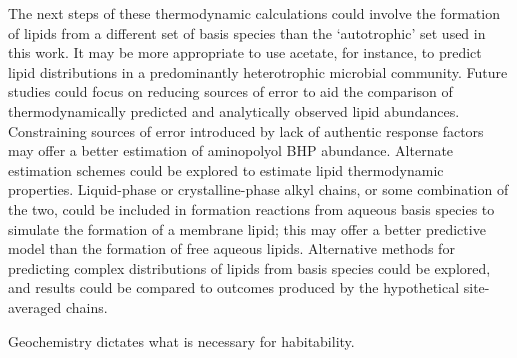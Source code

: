 The next steps of these thermodynamic calculations could involve the formation of lipids from a different set of basis species than the `autotrophic' set used in this work. It may be more appropriate to use acetate, for instance, to predict lipid distributions in a predominantly heterotrophic microbial community. Future studies could focus on reducing sources of error to aid the comparison of thermodynamically predicted and analytically observed lipid abundances. Constraining sources of error introduced by lack of authentic response factors may offer a better estimation of aminopolyol BHP abundance. Alternate estimation schemes could be explored to estimate lipid thermodynamic properties. Liquid-phase or crystalline-phase alkyl chains, or some combination of the two, could be included in formation reactions from aqueous basis species to simulate the formation of a membrane lipid; this may offer a better predictive model than the formation of free aqueous lipids. Alternative methods for predicting complex distributions of lipids from basis species could be explored, and results could be compared to outcomes produced by the hypothetical site-averaged chains.

Geochemistry dictates what is necessary for habitability.